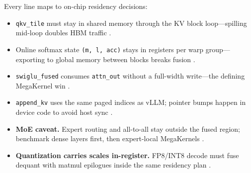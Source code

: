 Every line maps to on-chip residency decisions:
\begin{itemize}
\item \texttt{qkv\_tile} must stay in shared memory through the KV block loop---spilling mid-loop doubles HBM traffic \citep{dao2022flashattention,memoryfloor2026}.
\item Online softmax state \texttt{(m, l, acc)} stays in registers per warp group---exporting to global memory between blocks breaks fusion \citep{dao2022flashattention}.
\item \texttt{swiglu\_fused} consumes \texttt{attn\_out} without a full-width write---the defining MegaKernel win \citep{patel2025llminference,taxbreak2026}.
\item \texttt{append\_kv} uses the same paged indices as vLLM; pointer bumps happen in device code to avoid host sync \citep{kwon2023vllm,nvidia2024cudagraphs}.

\item \textbf{MoE caveat.} Expert routing and all-to-all stay outside the fused region; benchmark dense layers first, then expert-local MegaKernels \citep{liu2024deepseekv3,taxbreak2026,patel2025llminference,yirage2026,chen2020compilerbasedhardw,kwon2023vllm,memoryfloor2026,nvidia2024cudagraphs,amd2024aie,semianalysis2024tma,dao2022flashattention,dao2023flashdecoding,dlbook,amd2024xdna}.
\item \textbf{Quantization carries scales in-register.} FP8/INT8 decode must fuse dequant with matmul epilogues inside the same residency plan \citep{patel2025llminference,liu2024deepseekv3,nvidia2022hopper,semianalysis2024tma,chen2020compilerbasedhardw,yirage2026,taxbreak2026,memoryfloor2026,dao2022flashattention,kwon2023vllm,nvidia2024cudagraphs,amd2024aie,amd2024xdna,dlbook,dao2023flashdecoding}.


\end{itemize}
